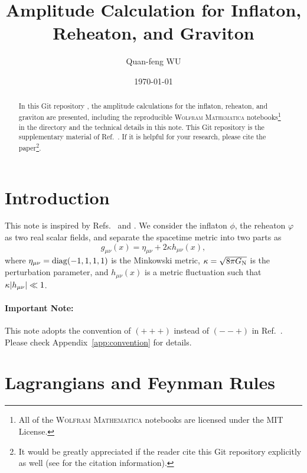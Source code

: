 \documentclass{article}
\title{Amplitude Calculation for Inflaton, Reheaton, and Graviton}
\author{Quan-feng WU\email{wuquanfeng@ihep.ac.cn}}
\affil{
    Institute of High Energy Physics, Chinese Academy of Sciences, \\
    Beijing 100049, CHINA
}
\date{\today\license}
\begin{document}
    \maketitle

    \begin{abstract}
        In this Git repository \cite{Wu:2025_amp-inflaton-reheaton-graviton}, the amplitude calculations for the inflaton, reheaton, and graviton are presented, including the reproducible \textsc{Wolfram Mathematica} notebooks\footnote{All of the \textsc{Wolfram Mathematica} notebooks are licensed under the MIT License.} in the directory  and the technical details in this note.
        This Git repository is the supplementary material of Ref.~\cite{Bernal:2025lxp}.
        If it is helpful for your research, please cite the paper\footnote{It would be greatly appreciated if the reader cite this Git repository explicitly as well (see \githubsrc[README.md] for the citation information).}.
    \end{abstract}
    \noindent\hrulefill

    \tableofcontents
    \clearpage

    \section{Introduction}

        This note is inspired by Refs.~\cite{Basile:2024oms} and \cite{Tokareva:2024_graviton}.
        We consider the inflaton $\phi$, the reheaton $\varphi$ as two real scalar fields, and separate the spacetime metric into two parts as \cite[Eq.~(2.13)]{Basile:2024oms}
        \begin{equation}
            g_{\mu\nu}(x) = \eta_{\mu\nu} + 2 \kappa h_{\mu\nu}(x),
        \end{equation}
        where $\eta_{\mu\nu} = \operatorname{diag}(-1, 1, 1, 1)$ is the Minkowski metric, $\kappa = \sqrt{8 \pi G_\mathrm{N}}$ is the perturbation parameter, and $h_{\mu\nu}(x)$ is a metric fluctuation such that $\kappa \abs{h_{\mu\nu}} \ll 1$.

        \paragraph{Important Note:}
        This note adopts the convention of $(+ + +)$ instead of $(- - +)$ in Ref.~\cite{Bernal:2025lxp}.
        Please check Appendix~\ref{app:convention} for details.

    \section{Lagrangians and Feynman Rules}
\end{document}
